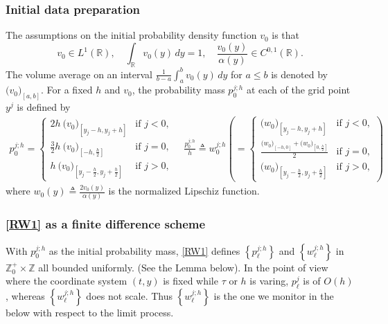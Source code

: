 \documentclass[a4paper,11pt]{article}
\theoremstyle{remark}
\begin{document}
\subsubsection{Initial data preparation}
The assumptions on the initial probability density function $v_0$ is that
\begin{equation*}
 v_0 \in L^1( \mathbb{R}), \quad \int_ \mathbb{R} v_0(y)\, dy = 1, \quad \frac{v_0(y)}{\alpha(y)} \in C^{0,1}(\mathbb{R}).
\end{equation*}
The volume average on an interval $\tfrac{1}{b-a}\int_a^b v_0(y)\, dy$ for $a\le b$ is denoted by $\big(v_0\big)_{[a,b]}$. For a fixed $h$ and $v_0$, the probability mass $p_{0}^{j;h}$  at each of the grid point $y^j$ is defined by
\begin{equation} \label{vol_aver+pmf}
 \begin{aligned}
 p_{0}^{j;h} = \left\{\begin{array}{ll}
                2h~\big(v_0\big)_{[y_j-h,y_j+h]} & \text{if } j<0,\\
                \frac{3}{2}h~\big(v_0\big)_{[-h,\frac{h}{2}]} & \text{if } j=0,\\                
                h~\big(v_0\big)_{[y_j-\frac{h}{2},y_j+\frac{h}{2}]} & \text{if } j>0,
               \end{array}\right.
 \quad \frac{p_{0}^{j;h}}{h}\triangleq w_{0}^{j;h} \left(= \left\{\begin{array}{ll}
                \big(w_0\big)_{[y_j-h,y_j+h]} & \text{if } j<0,\\
                \frac{\big(w_0\big)_{[-h,0]}+ \big(w_0\big)_{[0,\frac{h}{2}]}}{2} & \text{if } j=0,\\                
                \big(w_0\big)_{[y_j-\frac{h}{2},y_j+\frac{h}{2}]} & \text{if } j>0,
               \end{array}\right.\right)
 \end{aligned}
\end{equation}
where $w_0(y)\triangleq \frac{2v_0(y)}{\alpha(y)}$ is the normalized Lipschiz function. 


\subsubsection{\eqref{RW1} as a finite difference scheme}
With $p_{0}^{j;h}$ as the initial probability mass, \eqref{RW1} defines $\left\{p^{j;h}_{\ell}\right\}$ and $\left\{w^{j;h}_{\ell}\right\}$ in $\mathbb{Z}_0^+\times\mathbb{Z}$ all bounded uniformly. (See the Lemma below). In the point of view where the coordinate system $(t,y)$ is fixed while $\tau$ or $h$ is varing, $p^j_\ell$ is of $O(h)$, whereas $\left\{w^{j;h}_{\ell}\right\}$ does not scale. Thus $\left\{w^{j;h}_{\ell}\right\}$ is the one we monitor in the below with respect to the limit process.
\end{document}

